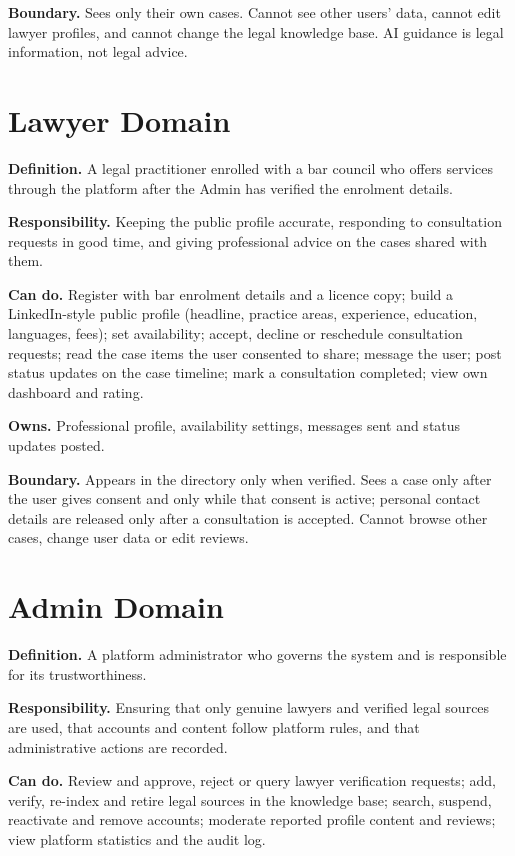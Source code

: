 \documentclass[11pt,a4paper]{article}
\begin{document}
\textbf{Boundary.} Sees only their own cases. Cannot see other users' data, cannot edit lawyer profiles, and cannot change the legal knowledge base. AI guidance is legal information, not legal advice.

\section{Lawyer Domain}
\textbf{Definition.} A legal practitioner enrolled with a bar council who offers services through the platform after the Admin has verified the enrolment details.

\textbf{Responsibility.} Keeping the public profile accurate, responding to consultation requests in good time, and giving professional advice on the cases shared with them.

\textbf{Can do.} Register with bar enrolment details and a licence copy; build a LinkedIn-style public profile (headline, practice areas, experience, education, languages, fees); set availability; accept, decline or reschedule consultation requests; read the case items the user consented to share; message the user; post status updates on the case timeline; mark a consultation completed; view own dashboard and rating.

\textbf{Owns.} Professional profile, availability settings, messages sent and status updates posted.

\textbf{Boundary.} Appears in the directory only when verified. Sees a case only after the user gives consent and only while that consent is active; personal contact details are released only after a consultation is accepted. Cannot browse other cases, change user data or edit reviews.

\section{Admin Domain}
\textbf{Definition.} A platform administrator who governs the system and is responsible for its trustworthiness.

\textbf{Responsibility.} Ensuring that only genuine lawyers and verified legal sources are used, that accounts and content follow platform rules, and that administrative actions are recorded.

\textbf{Can do.} Review and approve, reject or query lawyer verification requests; add, verify, re-index and retire legal sources in the knowledge base; search, suspend, reactivate and remove accounts; moderate reported profile content and reviews; view platform statistics and the audit log.
\end{document}
